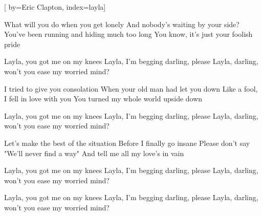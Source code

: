 
[%
    by={Eric Clapton},
    index={layla}]


    \label{layla}

    \beginverse
        What will you do when you get lonely
        And nobody's waiting by your side?
        You've been running and hiding much too long
        You know, it's just your foolish pride
    \endverse

    \beginchorus
        Layla, you got me on my knees
        Layla, I'm begging darling, please
        Layla, darling, won't you ease my worried mind?
    \endchorus

    \beginverse
        I tried to give you consolation
        When your old man had let you down
        Like a fool, I fell in love with you
        You turned my whole world upside down
    \endverse

    \beginchorus
        Layla, you got me on my knees
        Layla, I'm begging darling, please
        Layla, darling, won't you ease my worried mind?
    \endchorus

    \beginverse
        Let's make the best of the situation
        Before I finally go insane
        Please don't say "We'll never find a way"
        And tell me all my love's in vain
    \endverse

    \beginchorus
        Layla, you got me on my knees
        Layla, I'm begging darling, please
        Layla, darling, won't you ease my worried mind?
    \endchorus

    \beginchorus
        Layla, you got me on my knees
        Layla, I'm begging darling, please
        Layla, darling, won't you ease my worried mind?
    \endchorus
\endsong
